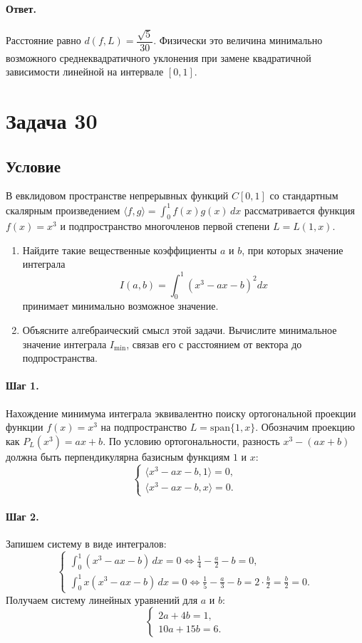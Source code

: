 \documentclass[12pt,a4paper]{article}
\theoremstyle{solution}
\newcommand{\task}[1]{\newpage\section*{Задача #1}}
\newcommand{\answer}{\paragraph{Ответ.}}
\newcommand{\step}[1]{\paragraph{Шаг #1.}}
\begin{document}
\answer
Расстояние равно $d(f, L) = \dfrac{\sqrt{5}}{30}$. Физически это величина минимально возможного среднеквадратичного уклонения при замене квадратичной зависимости линейной на интервале $[0,1]$.

\task{30}
\subsection*{Условие}
В евклидовом пространстве непрерывных функций $C[0, 1]$ со стандартным скалярным произведением $\langle f, g\rangle = \int_0^1 f(x)g(x)\,dx$ рассматривается функция $f(x) = x^3$ и подпространство многочленов первой степени $L = L(1, x)$.
\begin{enumerate}
    \item Найдите такие вещественные коэффициенты $a$ и $b$, при которых значение интеграла
    \[
    I(a, b) = \int_0^1 (x^3 - ax - b)^2 dx
    \]
    принимает минимально возможное значение.
    \item Объясните алгебраический смысл этой задачи. Вычислите минимальное значение интеграла $I_{\min}$, связав его с расстоянием от вектора до подпространства.
\end{enumerate}

\step{1} Нахождение минимума интеграла эквивалентно поиску ортогональной проекции функции $f(x) = x^3$ на подпространство $L = \mathrm{span}\{1, x\}$. Обозначим проекцию как $P_L(x^3) = ax + b$. По условию ортогональности, разность $x^3 - (ax + b)$ должна быть перпендикулярна базисным функциям $1$ и $x$:
\[
\begin{cases}
\langle x^3 - ax - b, 1\rangle = 0, \\
\langle x^3 - ax - b, x\rangle = 0.
\end{cases}
\]

\step{2} Запишем систему в виде интегралов:
\[
\begin{cases}
\displaystyle \int_0^1 (x^3 - ax - b)\,dx = 0 \iff \frac{1}{4} - \frac{a}{2} - b = 0, \\
\displaystyle \int_0^1 x(x^3 - ax - b)\,dx = 0 \iff \frac{1}{5} - \frac{a}{3} - b = 2 \cdot \frac{b}{2} = \frac{b}{2} = 0.
\end{cases}
\]
Получаем систему линейных уравнений для $a$ и $b$:
\[
\begin{cases}
2a + 4b = 1, \\
10a + 15b = 6.
\end{cases}
\]
\end{document}
